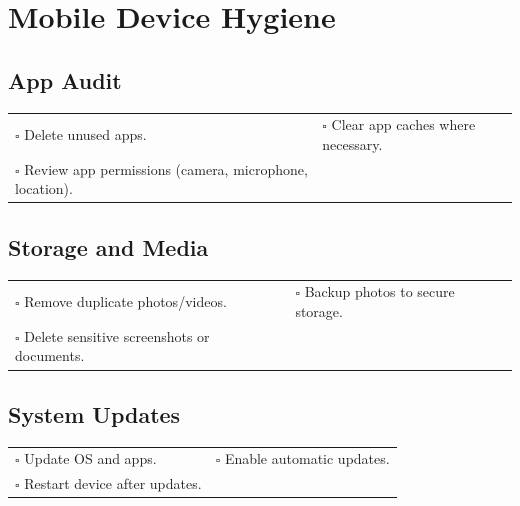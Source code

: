 
\section{Mobile Device Hygiene}
\label{sec:mobile}

\subsection{App Audit}

\begin{tabular}{p{9cm} p{8cm}}
$\square$ Delete unused apps. & $\square$ Clear app caches where necessary. \\ 
$\square$ Review app permissions (camera, microphone, location).  & \\ 
\end{tabular}

\subsection{Storage and Media}

\begin{tabular}{p{9cm} p{8cm}}
$\square$ Remove duplicate photos/videos. & $\square$ Backup photos to secure storage. \\ 
$\square$ Delete sensitive screenshots or documents. & \\ 
\end{tabular}

\subsection{System Updates}

\begin{tabular}{p{9cm} p{8cm}}
$\square$ Update OS and apps. & $\square$ Enable automatic updates. \\ 
$\square$ Restart device after updates. & \\ 
\end{tabular}

